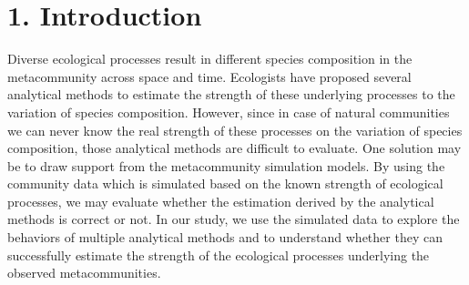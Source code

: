 
\chapter*{1. Introduction}
\setcounter{chapter}{1}
	\noindent
	Diverse ecological processes result in different species composition in the metacommunity across space and time. Ecologists have proposed several analytical methods to estimate the strength of these underlying processes to the variation of species composition. However, since in case of natural communities we can never know the real strength of these processes on the variation of species composition, those analytical methods are difficult to evaluate. One solution may be to draw support from the metacommunity simulation models. By using the community data which is simulated based on the known strength of ecological processes, we may evaluate whether the estimation derived by the analytical methods is correct or not. In our study, we use the simulated data to explore the behaviors of multiple analytical methods and to understand whether they can successfully estimate the strength of the ecological processes underlying the observed metacommunities.
	
